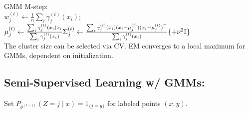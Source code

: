 GMM M-step:\\ $w_j^{(t)} \leftarrow \frac{1}{n} \sum_{i} \gamma_j^{(t)} (x_i)$; \\
$\mu_j^{(t)} \leftarrow \frac{\sum_{i} \gamma_j^{(t)} (x_i) x_i}{\sum_{i} \gamma_j^{(t)} (x_i)}\\
\Sigma_j^{(t)} \leftarrow \frac{\sum_{i} \gamma_j^{(t)}(x_i) (x_i - \mu_j^{(t)}) (x_i - \mu_j^{(t)})^\top}{\sum_{i} \gamma_j^{(t)}(x_i)} \{+\nu^2\mathbb{I}\}$\\ %

The cluster size can be selected via CV.
EM converges to a local maximum for GMMs, dependent on
initialization.
\subsection*{Semi-Supervised Learning w/ GMMs:}
Set $P_{\theta^{(t-1)}}(Z=j\mid x) =1_{\{j = y\}}$ for labeled points
$(x,y).$
\\
